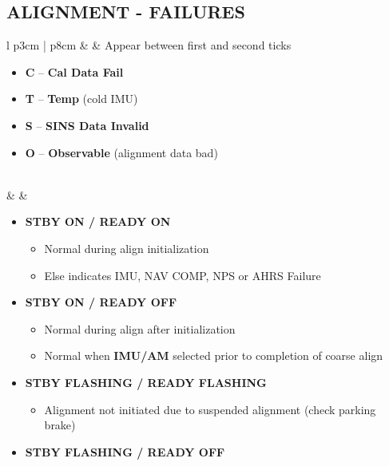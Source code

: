 \documentclass[fontHelvetica]{TechCheck}
\begin{document}
	\subsection{ALIGNMENT - FAILURES}

	\begin{center}
		\begin{longtable}{l p{3cm} | p{8cm}}
			\toprule
			\textbf{\textbullet} &  & Appear between first and second ticks
			\begin{minipage}[t]{\linewidth}
				\begin{itemize}
					\item \textbf{C} -- \textbf{Cal Data Fail}
					\item \textbf{T} -- \textbf{Temp} (cold IMU)
					\item \textbf{S} -- \textbf{SINS Data Invalid}
					\item \textbf{O} -- \textbf{Observable} (alignment data bad)
				\end{itemize}
			\end{minipage} \\
			\midrule
			\textbf{\textbullet} &  &
			\begin{minipage}[t]{\linewidth}
				\vspace{-7pt}
				\begin{itemize}
					\item \textbf{STBY ON / READY ON}
					\begin{itemize}
						\item Normal during align initialization
						\item Else indicates IMU, NAV COMP, NPS or AHRS Failure
					\end{itemize}
					\item \textbf{STBY ON / READY OFF}
					\begin{itemize}
						\item Normal during align after initialization
						\item Normal when \textbf{IMU/AM} selected prior to completion of coarse align
					\end{itemize}
					\item \textbf{STBY FLASHING / READY FLASHING}
					\begin{itemize}
						\item Alignment not initiated due to suspended alignment (check parking brake)
					\end{itemize}
					\item \textbf{STBY FLASHING / READY OFF}

\end{itemize}
\end{minipage}
\end{longtable}
\end{center}
\end{document}
